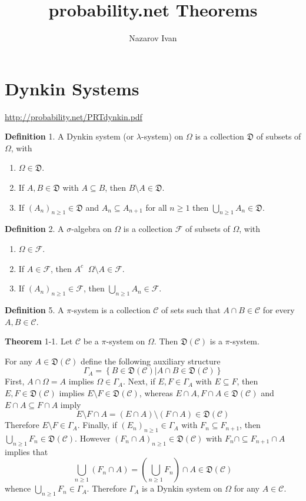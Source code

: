 \documentclass[a4paper]{article}
\title{probability.net Theorems}
\author{Nazarov Ivan}
\newcommand{\obj}[1]{\left\{ #1 \right \}}
\newcommand{\brac}[1]{\left ( #1 \right )}
\newcommand{\induc}[1]{\left . #1 \right \vert}
\newcommand{\Ccal}{\mathcal{C}}
\newcommand{\Fcal}{\mathcal{F}}
\newcommand{\Dyns}[1]{\mathfrak{D}\brac{#1}}
\newcommand{\defn}{\mathop{\overset{\Delta}{=}}\nolimits}
\begin{document}
\maketitle
{}
\tableofcontents
\clearpage

\section{Dynkin Systems} %
\label{sec:tut_1}
\url{http://probability.net/PRTdynkin.pdf}

\noindent \textbf{Definition} 1.
A Dynkin system (or $\lambda$-system) on $\Omega$ is a collection $\mathfrak{D}$ of subsets of $\Omega$, with \begin{enumerate}
	\item $\Omega\in \mathfrak{D}$.
	\item If $A,B\in \mathfrak{D}$ with $A\subseteq B$, then $B\setminus A\in \mathfrak{D}$.
	\item If $\brac{A_n}_{n\geq 1}\in \mathfrak{D}$ and $A_n\subseteq A_{n+1}$ for all $n\geq 1$ then $\bigcup_{n\geq 1}A_n \in \mathfrak{D}$.
\end{enumerate}

\noindent \textbf{Definition} 2.
A $\sigma$-algebra on $\Omega$ is a collection $\Fcal$ of subsets of $\Omega$, with \begin{enumerate}
	\item $\Omega\in \Fcal$.
	\item If $A\in \Fcal$, then $A^c \defn \Omega\setminus A\in \Fcal$.
	\item If $\brac{A_n}_{n\geq 1}\in \Fcal$, then $\bigcup_{n\geq 1}A_n \in \Fcal$.
\end{enumerate}

\noindent \textbf{Definition} 5.
A $\pi$-system is a collection $\Ccal$ of sets such that $A\cap B\in \Ccal$ for every $A,B\in \Ccal$.

\label{thm:dynkin_pi} \noindent \textbf{Theorem} 1-1.
Let $\Ccal$ be a $\pi$-system on $\Omega$. Then $\Dyns{\Ccal}$ is a $\pi$-system.

For any $A\in \Dyns{\Ccal}$ define the following auxiliary structure \[\Gamma_A = \obj{\induc{ B\in\Dyns{\Ccal} } A\cap B \in \Dyns{\Ccal}}\] First, $A\cap \Omega = A$ implies $\Omega \in \Gamma_A$. Next, if $E,F\in \Gamma_A$ with $E\subseteq F$, then $E, F\in \Dyns{\Ccal}$ implies $E\setminus F\in \Dyns{\Ccal}$, whereas $E\cap A, F\cap A\in \Dyns{\Ccal}$ and $E\cap A\subseteq F\cap A$ imply \[E\setminus F \cap A = \brac{E\cap A}\setminus \brac{F\cap A}\in \Dyns{\Ccal}\] Therefore $E\setminus F\in \Gamma_A$. Finally, if $\brac{E_n}_{n\geq1}\in \Gamma_A$ with $F_n\subseteq F_{n+1}$, then $\bigcup_{n\geq1}F_n\in \Dyns{\Ccal}$. However $\brac{F_n\cap A}_{n\geq1}\in \Dyns{\Ccal}$ with $F_n\cap \subseteq F_{n+1} \cap A$ implies that \[\bigcup_{n\geq1}\brac{F_n\cap A} = \brac{\bigcup_{n\geq1}F_n}\cap A\in \Dyns{\Ccal}\] whence $\bigcup_{n\geq1}F_n \in \Gamma_A$. Therefore $\Gamma_A$ is a Dynkin system on $\Omega$ for any $A\in \Ccal$.
\end{document}
